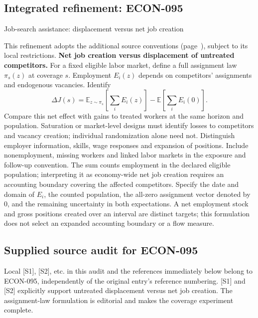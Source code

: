 \documentclass[11pt,a4paper]{article}
\begin{document}
\subsection*{Integrated refinement: ECON-095}
{\sffamily\small\color{muted}Job-search assistance: displacement versus net job creation\par}
This refinement adopts the additional source conventions
(page~\pageref{audited:conventions}), subject to its local restrictions.
\textbf{Net job creation versus displacement of untreated competitors.}
For a fixed eligible labor market, define a full assignment law $\pi_s(z)$
at coverage $s$. Employment $E_i(z)$ depends on competitors' assignments and
endogenous vacancies. Identify
\[
\Delta J(s)=\mathbb E_{z\sim\pi_s}\!\left[\sum_iE_i(z)\right]
              -\mathbb E\left[\sum_iE_i(0)\right].
\]
Compare this net effect with gains to treated workers at the same horizon and
population. Saturation or market-level designs must identify losses to
competitors and vacancy creation; individual randomization alone need not.
Distinguish employer information, skills, wage responses and expansion of
positions. Include nonemployment, missing workers and linked labor markets in
the exposure and follow-up convention. The sum counts employment in the declared eligible population; interpreting it as economy-wide net job creation requires an accounting boundary covering the affected competitors. Specify the date and domain of \(E_i\), the counted population, the all-zero assignment vector denoted by \(0\), and the remaining uncertainty in both expectations. A net employment stock and gross positions created over an interval are distinct targets; this formulation does not select an expanded accounting boundary or a flow measure.
\subsection*{Supplied source audit for ECON-095}
Local [S1], [S2], etc. in this audit and the references immediately below
belong to ECON-095, independently of the original entry's reference numbering.
[S1] and [S2] explicitly support untreated displacement versus net job creation. The assignment-law formulation is editorial and makes the coverage experiment complete.
\end{document}
